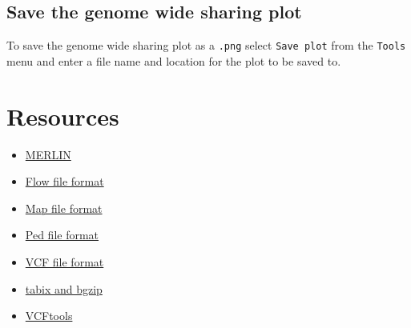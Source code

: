 \documentclass{article}
\begin{document}
\subsection{Save the genome wide sharing plot}
To save the genome wide sharing plot as a \texttt{.png} select \texttt{Save plot} from the \texttt{Tools} menu and enter a file name and location for the plot to be saved to.

\section{Resources}
\begin{itemize}
\item{\href{http://www.sph.umich.edu/csg/abecasis/Merlin/}{MERLIN}}
\item{\href{http://www.sph.umich.edu/csg/abecasis/Merlin/tour/haplotyping.html}{Flow file format}}
\item{\href{http://pngu.mgh.harvard.edu/~purcell/plink/data.shtml#map}{Map file format}}
\item{\href{http://pngu.mgh.harvard.edu/~purcell/plink/data.shtml#ped}{Ped file format}}
\item{\href{http://www.1000genomes.org/node/101}{VCF file format}}
\item{\href{http://sourceforge.net/projects/samtools/files/tabix/}{tabix and bgzip}}
\item{\href{http://vcftools.sourceforge.net/}{VCFtools}}
\end{itemize}
\end{document}
